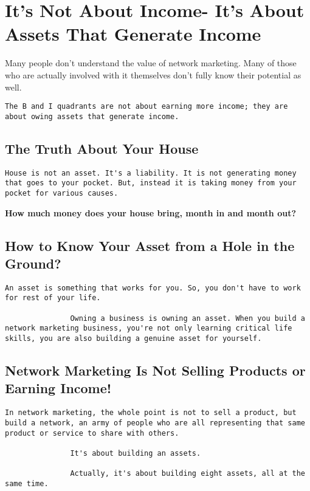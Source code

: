\documentclass[a4paper, 12pt]{report}
\begin{document}
    \chapter{It's Not About Income- It's About Assets That Generate Income}
    Many people don't understand the value of network marketing. Many of those who are actually involved with it themselves don't fully know their potential as well.
    \begin{lstlisting}[style=latexFrameTB]
               The B and I quadrants are not about earning more income; they are about owing assets that generate income.
    \end{lstlisting}
    \section{The Truth About Your House}
    \begin{lstlisting}[style=latexFrameTB]
               House is not an asset. It's a liability. It is not generating money that goes to your pocket. But, instead it is taking money from your pocket for various causes.
    \end{lstlisting}
     \begin{framedquest*}
       \textbf{How much money does your house bring, month in and month out?}
       
    \end{framedquest*}
    \section{How to Know Your Asset from a Hole in the Ground?}
     \begin{lstlisting}[style=latexFrameTB]
               An asset is something that works for you. So, you don't have to work for rest of your life.
               
               Owning a business is owning an asset. When you build a network marketing business, you're not only learning critical life skills, you are also building a genuine asset for yourself.
    \end{lstlisting}
     \section{Network Marketing Is Not Selling Products or Earning Income!}
     \begin{lstlisting}[style=latexFrameTB]
               In network marketing, the whole point is not to sell a product, but build a network, an army of people who are all representing that same product or service to share with others.
               
               It's about building an assets.
               
               Actually, it's about building eight assets, all at the same time.
    \end{lstlisting}
    
\end{document}
